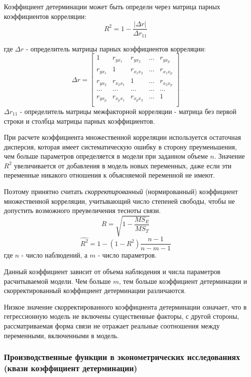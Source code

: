 \documentclass[aps,%
12pt,%
final,%
oneside,
onecolumn,%
musixtex, %
superscriptaddress,%
centertags]{article} %
\theoremstyle{plain}
\theoremstyle{definition}
\theoremstyle{remark}
\begin{document}
Коэффициент детерминации может быть определн через матрица парных коэффициентов корреляции:
$$ R^2 = 1 -\frac{| \Delta r |}{\Delta r_{11}} $$

где $\Delta r$ - определитель матрицы парных коэффициентов корреляции:
$$\Delta r = \begin{bmatrix}
	1 & r_{yx_1} & r_{yx_2} & \ldots & r_{yx_p} \\
	r_{yx_1} & 1 & r_{x_1x_2} & \ldots & r_{x_1x_p} \\
	r_{yx_2} & r_{x_2x_1} & 1 & \ldots & r_{x_2x_p} \\
	\ldots & \ldots & \ldots & \ldots & \ldots \\
	r_{yx_p} & r_{x_px_1} & r_{x_px_2} & \ldots & 1 \\
\end{bmatrix}$$
$\Delta r_{11}$ - определитель матрицы межфакторной корреляции - матрица без первой строки и столбца матрицы парных коэффициентов.

При расчете коэффициента множественной корреляции используется остаточная дисперсия, которая имеет систематическую ошибку в сторону преуменьшения, чем больше параметров определяется в модели при заданном объеме $n$. Значение $R^2$ увеличивается от добавления в модель новых переменных, даже если эти переменные никакого отношения к объясняемой переменной не имеют. 

Поэтому принятно считать \textit{скорректированный} (нормированный) коэффициент множественной корреляции, учитывающий число степеней свободы, чтобы не допустить возможного преувеличения тесноты связи.
$$ R = \sqrt{1 - \frac{MS_E}{MS_T}}$$
$$ \hat{R^2} = 1 -(1-R^2) \frac{n-1}{n-m-1}$$
где $n$ - число наблюдений, а $m$ - число параметров.

Данный коэффициент зависит от объема наблюдения и числа параметров расчитываемой модели. Чем больше $m$, тем больше коэффициент детерминации и скорректированный коэффициент детерминации различаются.

Низкое значение скорректированного коэффициента детерминации означает, что в гегрессионную модель не включены существенные факторы, с другой стороны, рассматриваемая форма связи не отражает реальные соотношения между переменными, включенными в модель.

\subsubsection{Производственные функции в эконометрических исследованиях (квази коэффициент детерминации)}
\end{document}
